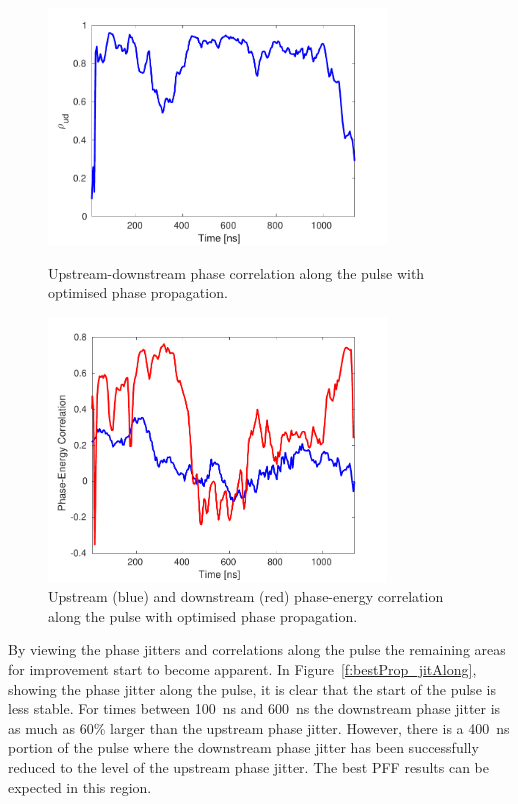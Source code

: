 \begin{figure}
  \centering
  \includegraphics[width=0.8\textwidth]{Figures/propagation/bestProp_corrAlong}
  \caption{Upstream-downstream phase correlation along the pulse with optimised phase propagation.}
  \label{f:bestProp_corrAlong}
  \includegraphics[width=0.8\textwidth]{Figures/propagation/bestProp_enCorrAlong}
  \caption{Upstream (blue) and downstream (red) phase-energy correlation along the pulse with optimised phase propagation.}
  \label{f:bestProp_enCorrAlong}
\end{figure}

By viewing the phase jitters and correlations along the pulse the remaining areas for improvement start to become apparent. In Figure~\ref{f:bestProp_jitAlong}, showing the phase jitter along the pulse, it is clear that the start of the pulse is less stable. For times between 100~ns and 600~ns the downstream phase jitter is as much as 60\% larger than the upstream phase jitter.  However, there is a 400~ns portion of the pulse where the downstream phase jitter has been successfully reduced to the level of the upstream phase jitter. The best PFF results can be expected in this region.

